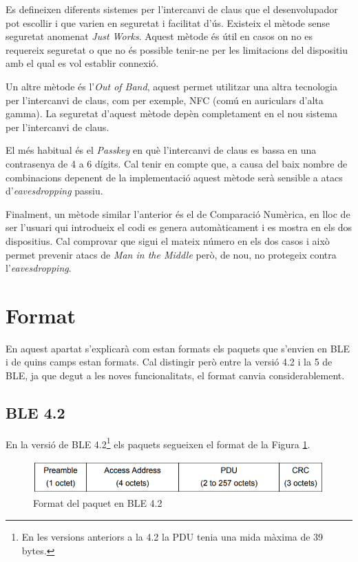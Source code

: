 Es defineixen diferents sistemes per l'intercanvi de claus que el desenvolupador pot escollir i que varien en seguretat i facilitat d'ús.
Existeix el mètode sense seguretat anomenat \textit{Just Works}.
Aquest mètode és útil en casos on no es requereix seguretat o que no és possible tenir-ne per les limitacions del dispositiu amb el qual es vol establir connexió.

Un altre mètode és l'\textit{Out of Band}, aquest permet utilitzar una altra tecnologia per l'intercanvi de claus, com per exemple, NFC (comú en auriculars d'alta gamma).
La seguretat d'aquest mètode depèn completament en el nou sistema per l'intercanvi de claus.

El més habitual és el \textit{Passkey} en què l'intercanvi de claus es bassa en una contrasenya de 4 a 6 dígits.
Cal tenir en compte que, a causa del baix nombre de combinacions depenent de la implementació aquest mètode serà sensible a atacs d'\textit{eavesdropping} passiu.

Finalment, un mètode similar l'anterior és el de Comparació Numèrica, en lloc de ser l'usuari qui introdueix el codi es genera automàticament i es mostra en els dos dispositius.
Cal comprovar que sigui el mateix número en els dos casos i això permet prevenir atacs de \textit{Man in the Middle} però, de nou, no protegeix contra l'\textit{eavesdropping}.


\section{Format}
\label{sec:format}
En aquest apartat s'explicarà com estan formats els paquets que s'envien en BLE i de quins camps estan formats.
Cal distingir però entre la versió 4.2 i la 5 de BLE, ja que degut a les noves funcionalitats, el format canvia considerablement.

\subsection{BLE 4.2}
En la versió de BLE 4.2\footnote{En les versions anteriors a la 4.2 la PDU tenia una mida màxima de 39 bytes.} els paquets segueixen el format de la Figura \ref{fig:4_2_format}.

\begin{figure}[!h]
	\begin{center}
		\includegraphics[width=1\textwidth]{./images/Packet_format_4_2.png}
		\caption{Format del paquet en BLE 4.2 \cite{BLE_4.2_packet_format}}
		\label{fig:4_2_format}
	\end{center}
\end{figure}

